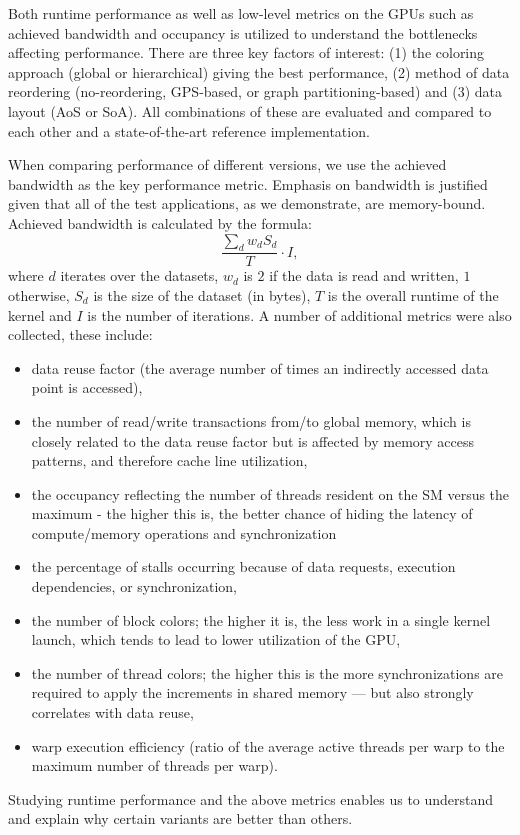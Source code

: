 Both runtime performance as well as low-level metrics on the GPUs such as 
achieved bandwidth and occupancy is utilized to understand the bottlenecks 
affecting performance. There are three key factors of interest: (1) 
the coloring approach (global or hierarchical) giving the best performance, 
(2) method of data reordering (no-reordering, GPS-based, or graph 
partitioning-based) and (3) data layout (AoS or SoA). All combinations of these 
are evaluated and compared to each other and a state-of-the-art reference 
implementation.

When comparing performance of different versions, we use the achieved bandwidth
as the key performance metric. Emphasis on bandwidth is justified given that 
all of the test applications, as we demonstrate, are memory-bound. Achieved 
bandwidth is calculated by the formula: $$\frac{\sum_{d} w_dS_d}{T} \cdot I,$$ 
where $d$ iterates over the datasets, $w_d$ is $2$ if the data is read and 
written, $1$ otherwise, $S_d$ is the size of the dataset (in bytes), $T$ is the 
overall runtime of the kernel and $I$ is the number of iterations. A number 
of additional metrics were also collected, these include:
\begin{itemize}
\item data reuse factor (the average number of times an indirectly accessed
data point is accessed),
\item the number of read/write transactions from/to global memory, which is
closely related to the data reuse factor but is affected by memory access
patterns, and therefore cache line utilization,
\item the occupancy reflecting the number of threads resident on the SM versus
the maximum - the higher this is, the better chance of hiding the latency of
compute/memory operations and synchronization
\item the percentage of stalls occurring because of data requests, execution
dependencies, or synchronization,
\item the number of block colors; the higher it is, the less work in a
single kernel launch, which tends to lead to lower utilization of the GPU,
\item the number of thread colors; the higher this is the more
synchronizations are required to apply the increments in shared memory ---
but also strongly correlates with data reuse,
\item warp execution efficiency (ratio of the average active threads per warp
to the maximum number of threads per warp).
\end{itemize}
Studying runtime performance and the above metrics enables us to understand 
and explain why certain variants are better than others.


